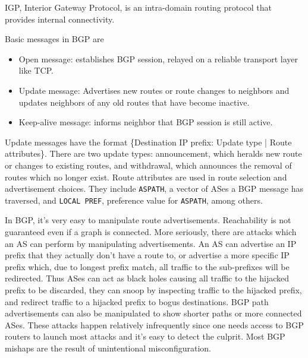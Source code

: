 IGP, Interior Gateway Protocol, is an intra-domain routing protocol that
provides internal connectivity.

Basic messages in BGP are
\begin{itemize}
      \item Open message: establishes BGP session, relayed on a reliable transport layer like TCP.
      \item Update message: Advertises new routes or route changes to neighbors and updates
            neighbors of any old routes that have become inactive.
      \item Keep-alive message: informs neighbor that BGP session is still active.
\end{itemize}

Update messages have the format \{Destination IP prefix: Update type | Route attributes\}.
There are two update types: announcement, which heralds new route or changes to
existing routes, and withdrawal, which announces the removal of routes which no longer
exist. Route attributes are used in route selection and advertisement choices. They
include \texttt{ASPATH}, a vector of ASes a BGP message has traversed, and
\texttt{LOCAL PREF}, preference value for \texttt{ASPATH}, among others.

In BGP, it's very easy to manipulate route advertisements. Reachability is
not guaranteed even if a graph is connected. More seriously, there are
attacks which an AS can perform by manipulating advertisements. An AS can
advertise an IP prefix that they actually don't have a route to, or
advertise a more specific IP prefix which, due to longest prefix match,
all traffic to the sub-prefixes will be redirected. Thus ASes can act as
black holes causing all traffic to the hijacked prefix to be discarded,
they can snoop by inspecting traffic to the hijacked prefix, and redirect
traffic to a hijacked prefix to bogus destinations.
BGP path advertisements can also be manipulated to show shorter paths
or more connected ASes. These attacks happen relatively infrequently
since one needs access to BGP routers to launch most attacks and
it's easy to detect the culprit. Most BGP mishaps are the result
of unintentional misconfiguration.